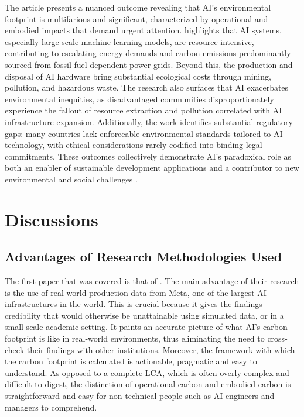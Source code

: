 \documentclass[a4paper, 12pt]{article}
\begin{document}
\par The article presents a nuanced outcome revealing that AI's environmental footprint is multifarious and significant, characterized by operational and embodied impacts that demand urgent attention. \citet{Zhuk2023} highlights that AI systems, especially large-scale machine learning models, are resource-intensive, contributing to escalating energy demands and carbon emissions predominantly sourced from fossil-fuel-dependent power grids. Beyond this, the production and disposal of AI hardware bring substantial ecological costs through mining, pollution, and hazardous waste. The research also surfaces that AI exacerbates environmental inequities, as disadvantaged communities disproportionately experience the fallout of resource extraction and pollution correlated with AI infrastructure expansion. Additionally, the work identifies substantial regulatory gaps: many countries lack enforceable environmental standards tailored to AI technology, with ethical considerations rarely codified into binding legal commitments. These outcomes collectively demonstrate AI's paradoxical role as both an enabler of sustainable development applications and a contributor to new environmental and social challenges \citep[pp.~950--955]{Zhuk2023}.
\section{Discussions}
\subsection{Advantages of Research Methodologies Used}
The first paper that was covered is that of \citet{Wu2022}. The main advantage of their research is the use of real-world production data from Meta, one of the largest AI infrastructures in the world. This is crucial because it gives the findings credibility that would otherwise be unattainable using simulated data, or in a small-scale academic setting. It paints an accurate picture of what AI's carbon footprint is like in real-world environments, thus eliminating the need to cross-check their findings with other institutions. Moreover, the framework with which the carbon footprint is calculated is actionable, pragmatic and easy to understand. As opposed to a complete LCA, which is often overly complex and difficult to digest, the distinction of operational carbon and embodied carbon is straightforward and easy for non-technical people such as AI engineers and managers to comprehend.
\end{document}
